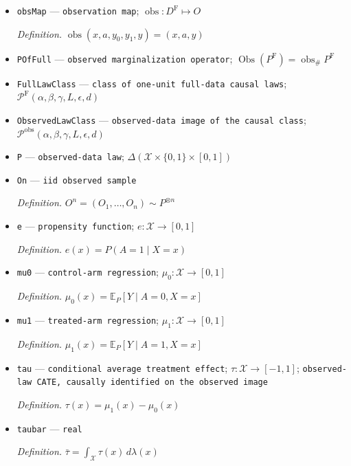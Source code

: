 \documentclass{article}
\begin{document}
\begin{itemize}
  \par\smallskip\noindent\emph{Definition.} \(\tau^{\mathrm F}(x)=\mu_1^{\mathrm F}(x)-\mu_0^{\mathrm F}(x)\)
  \item \texttt{obsMap} --- \texttt{observation map}; \(\operatorname{obs}:D^{\mathrm F}\mapsto O\)
  \par\smallskip\noindent\emph{Definition.} \(\operatorname{obs}(x,a,y_0,y_1,y)=(x,a,y)\)
  \item \texttt{POfFull} --- \texttt{observed marginalization operator}; \(\operatorname{Obs}(P^{\mathrm F})=\operatorname{obs}_{\#}P^{\mathrm F}\)
  \item \texttt{FullLawClass} --- \texttt{class of one-\allowbreak{}unit full-\allowbreak{}data causal laws}; \(\mathcal P^{\mathrm F}(\alpha,\beta,\gamma,L,\epsilon,d)\)
  \item \texttt{ObservedLawClass} --- \texttt{observed-\allowbreak{}data image of the causal class}; \(\mathcal P^{\mathrm{obs}}(\alpha,\beta,\gamma,L,\epsilon,d)\)
  \item \texttt{P} --- \texttt{observed-\allowbreak{}data law}; \(\Delta(\mathcal X\times\{0,1\}\times[0,1])\)
  \item \texttt{On} --- \texttt{iid observed sample}
  \par\smallskip\noindent\emph{Definition.} \(O^n=(O_1,\ldots,O_n)\sim P^{\otimes n}\)
  \item \texttt{e} --- \texttt{propensity function}; \(e:\mathcal X\to[0,1]\)
  \par\smallskip\noindent\emph{Definition.} \(e(x)=P(A=1\mid X=x)\)
  \item \texttt{mu0} --- \texttt{control-\allowbreak{}arm regression}; \(\mu_0:\mathcal X\to[0,1]\)
  \par\smallskip\noindent\emph{Definition.} \(\mu_0(x)=\mathbb E_P[Y\mid A=0,X=x]\)
  \item \texttt{mu1} --- \texttt{treated-\allowbreak{}arm regression}; \(\mu_1:\mathcal X\to[0,1]\)
  \par\smallskip\noindent\emph{Definition.} \(\mu_1(x)=\mathbb E_P[Y\mid A=1,X=x]\)
  \item \texttt{tau} --- \texttt{conditional average treatment effect}; \(\tau:\mathcal X\to[-1,1]\); \texttt{observed-\allowbreak{}law CATE,\allowbreak{} causally identified on the observed image}
  \par\smallskip\noindent\emph{Definition.} \(\tau(x)=\mu_1(x)-\mu_0(x)\)
  \item \texttt{taubar} --- \texttt{real}
  \par\smallskip\noindent\emph{Definition.} \(\bar\tau=\int_{\mathcal X}\tau(x)\,d\lambda(x)\)

\end{itemize}
\end{document}
